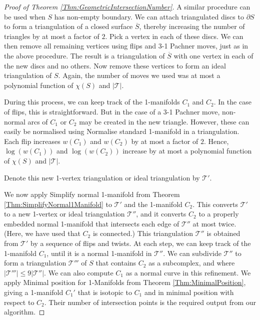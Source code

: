 \documentclass[oneside]{amsart}
\numberwithin{equation}{section}
\theoremstyle{plain}
\theoremstyle{definition}
\newcommand{\calT}{{\mathcal{T}}}
\begin{document}
\begin{proof}[Proof of Theorem \ref{Thm:GeometricIntersectionNumber}]
A similar procedure can be used when $S$ has non-empty boundary. We can attach triangulated discs to $\partial S$ to form a triangulation of a closed surface $\overline{S}$, thereby increasing the number of triangles by at most a factor of $2$. Pick a vertex in each of these discs. We can then remove all remaining vertices using flips and 3-1 Pachner moves, just as in the above procedure. The result is a triangulation of $\overline{S}$ with one vertex in each of the new discs and no others. Now remove these vertices to form an ideal triangulation of $S$. Again, the number of moves we used was at most a polynomial function of $\chi(S)$ and $|\calT|$.

During this process, we can keep track of the 1-manifolds $C_1$ and $C_2$. In the case of flips, this is straightforward. But in the case of a 3-1 Pachner move, non-normal arcs of $C_1$ or $C_2$ may be created in the new triangle. However, these can easily be normalised using {\sc Normalise standard 1-manifold in a triangulation}. 
Each flip increases $w(C_1)$ and $w(C_2)$ by at most a factor of $2$. Hence, $\log(w(C_1))$ and $\log(w(C_2))$ increase by at most a polynomial function of $\chi(S)$ and $|\calT|$.

Denote this new 1-vertex triangulation or ideal triangulation by $\calT'$.

We now apply {\sc Simplify normal 1-manifold} from Theorem \ref{Thm:SimplifyNormal1Manifold} to $\calT'$ and the 1-manifold $C_2$. This converts $\calT'$ to a new 1-vertex or ideal triangulation $\calT''$, and it converts $C_2$ to a properly embedded normal 1-manifold that intersects each edge of $\calT''$ at most twice. (Here, we have used that $C_2$ is connected.) This triangulation $\calT''$ is obtained from $\calT'$ by a sequence of flips and twists. At each step, we can keep track of the 1-manifold $C_1$, until it is a normal 1-manifold in $\calT''$. We can subdivide $\calT''$ to form a triangulation $\calT'''$ of $S$ that contains $C_2$ as a subcomplex, and where $|\calT'''| \leq 9 |\calT''|$. 
We can also compute $C_1$ as a normal curve in this refinement. We apply {\sc Minimal position for 1-Manifolds} from Theorem \ref{Thm:MinimalPosition}, giving a 1-manifold $C_1'$ that is isotopic to $C_1$ and in minimal position with respect to $C_2$. Their number of intersection points is the required output from our algorithm.
\end{proof}
\end{document}
